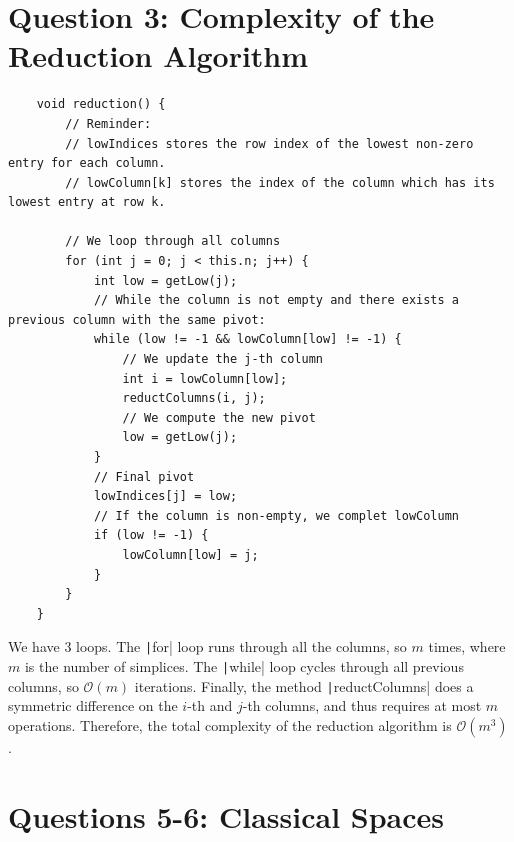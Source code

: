 \documentclass[a4paper,11pt,openany,extrafontsizes,oneside,article]{memoir}
\begin{document}
\tightlists{}

\maketitle



\chapter{Question 3: Complexity of the Reduction Algorithm}
\label{chap:q3}

\begin{verbatim}
    void reduction() {
        // Reminder:
        // lowIndices stores the row index of the lowest non-zero entry for each column.
        // lowColumn[k] stores the index of the column which has its lowest entry at row k.

        // We loop through all columns
        for (int j = 0; j < this.n; j++) {
            int low = getLow(j);
            // While the column is not empty and there exists a previous column with the same pivot:
            while (low != -1 && lowColumn[low] != -1) {
                // We update the j-th column
                int i = lowColumn[low];
                reductColumns(i, j);
                // We compute the new pivot
                low = getLow(j);
            }
            // Final pivot
            lowIndices[j] = low;
            // If the column is non-empty, we complet lowColumn
            if (low != -1) {
                lowColumn[low] = j;
            }
        }
    }
\end{verbatim}

We have 3 loops. The \texttt|for| loop runs through all the
columns, so $m$ times, where $m$ is the number of simplices. The
\texttt|while| loop cycles through all previous columns, so
$\mathcal{O}(m)$ iterations. Finally, the method
\texttt|reductColumns| does a symmetric difference on the
$i$-th and $j$-th columns, and thus requires at most $m$
operations. Therefore, the total complexity of the reduction algorithm
is $\mathcal{O}(m^3)$.


\chapter{Questions 5-6: Classical Spaces}
\label{chap:q5}
\end{document}
